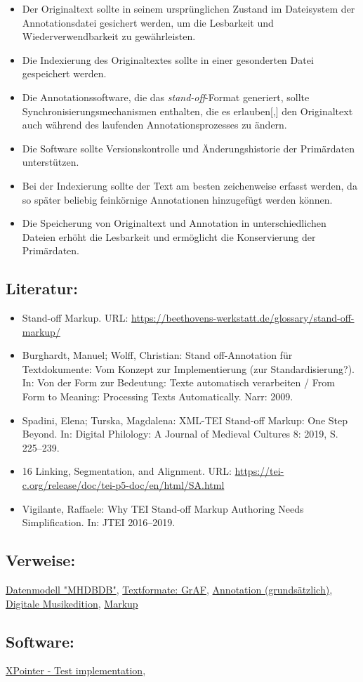 \documentclass{article}
\begin{document}
        \begin{itemize}\item {Der Originaltext sollte in seinem ursprünglichen Zustand im Dateisystem der Annotationsdatei gesichert werden, um die Lesbarkeit und Wiederverwendbarkeit zu gewährleisten.}\item {Die Indexierung des Originaltextes sollte in einer gesonderten Datei gespeichert werden.}\item {Die Annotationssoftware, die das \emph{stand-off}-Format generiert, sollte Synchronisierungsmecha­nismen enthalten, die es erlauben[,] den Originaltext auch während des laufenden Annotationspro­zesses zu ändern.}\item {Die Software sollte Versionskontrolle und Änderungshistorie der Primärdaten unterstützen.}\item {Bei der Indexierung sollte der Text am besten zeichenweise erfasst werden, da so später beliebig feinkörnige Annotationen hinzugefügt werden können.}\item {Die Speicherung von Originaltext und Annotation in unterschiedlichen Dateien erhöht die Lesbarkeit und ermöglicht die Konservierung der Primärdaten.}\end{itemize}\subsection*{Literatur:}\begin{itemize}\item Stand-off Markup. URL: \url{https://beethovens-werkstatt.de/glossary/stand-off-markup/}\item Burghardt, Manuel; Wolff, Christian: Stand off-Annotation für Textdokumente: Vom Konzept zur Implementierung (zur Standardisierung?). In: Von der Form zur Bedeutung: Texte automatisch verarbeiten / From Form to Meaning: Processing Texts Automatically. Narr: 2009.\item Spadini, Elena; Turska, Magdalena: XML-TEI Stand-off Markup: One Step Beyond. In: Digital Philology: A Journal of Medieval Cultures 8: 2019, S. 225–239.\item 16 Linking, Segmentation, and Alignment. URL: \url{https://tei-c.org/release/doc/tei-p5-doc/en/html/SA.html}\item Vigilante, Raffaele: Why TEI Stand-off Markup Authoring Needs Simplification. In: JTEI 2016–2019.\end{itemize}\subsection*{Verweise:}\href{https://gams.uni-graz.at/o:konde.52}{Datenmodell "MHDBDB"}, \href{https://gams.uni-graz.at/o:konde.185}{Textformate: GrAF}, \href{https://gams.uni-graz.at/o:konde.17}{Annotation (grundsätzlich)}, \href{https://gams.uni-graz.at/o:konde.139}{Digitale Musikedition}, \href{https://gams.uni-graz.at/o:konde.126}{Markup}\subsection*{Software:}\href{http://www.cs.unibo.it/projects/xslt%2B%2B/XPointerTest.html}{XPointer - Test implementation}, 
\end{document}

